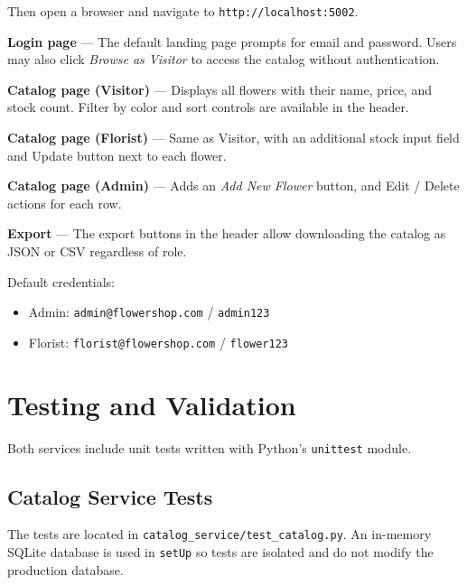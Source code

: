 \par Then open a browser and navigate to \texttt{http://localhost:5002}.

\par \textbf{Login page} — The default landing page prompts for email and password. Users may also click \emph{Browse as Visitor} to access the catalog without authentication.

\par \textbf{Catalog page (Visitor)} — Displays all flowers with their name, price, and stock count. Filter by color and sort controls are available in the header.

\par \textbf{Catalog page (Florist)} — Same as Visitor, with an additional stock input field and Update button next to each flower.

\par \textbf{Catalog page (Admin)} — Adds an \emph{Add New Flower} button, and Edit / Delete actions for each row.

\par \textbf{Export} — The export buttons in the header allow downloading the catalog as JSON or CSV regardless of role.

\par Default credentials:
\begin{itemize}
    \item Admin: \texttt{admin@flowershop.com} / \texttt{admin123}
    \item Florist: \texttt{florist@flowershop.com} / \texttt{flower123}
\end{itemize}


\section{Testing and Validation}

\par Both services include unit tests written with Python's \texttt{unittest} module.

\subsection{Catalog Service Tests}

\par The tests are located in \texttt{catalog\_service/test\_catalog.py}. An in-memory SQLite database is used in \texttt{setUp} so tests are isolated and do not modify the production database.

